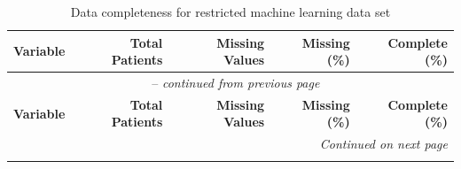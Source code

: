 \begin{longtable}{lrrrr}
\caption{Data completeness for restricted machine learning data set} \label{tab:data_summary} \\

\toprule
\textbf{Variable} & \textbf{Total Patients} & \textbf{Missing Values} & \textbf{Missing (\%)} & \textbf{Complete (\%)} \\
\midrule
\endfirsthead

\multicolumn{5}{c}{\tablename\ \thetable{} -- \textit{continued from previous page}} \\
\toprule
\textbf{Variable} & \textbf{Total Patients} & \textbf{Missing Values} & \textbf{Missing (\%)} & \textbf{Complete (\%)} \\
\midrule
\endhead

\midrule
\multicolumn{5}{r}{\textit{Continued on next page}} \\
\endfoot

\bottomrule
\endlastfoot


\end{longtable}
